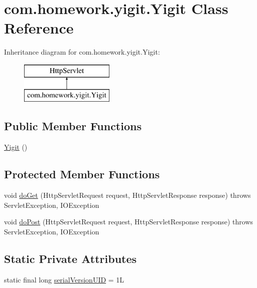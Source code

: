 \hypertarget{classcom_1_1homework_1_1yigit_1_1_yigit}{}\section{com.\+homework.\+yigit.\+Yigit Class Reference}
\label{classcom_1_1homework_1_1yigit_1_1_yigit}
Inheritance diagram for com.\+homework.\+yigit.\+Yigit\+:\begin{figure}[H]
\begin{center}
\leavevmode
\includegraphics[height=2.000000cm]{classcom_1_1homework_1_1yigit_1_1_yigit}
\end{center}
\end{figure}
\subsection*{Public Member Functions}
\begin{DoxyCompactItemize}
\item 
\hyperlink{classcom_1_1homework_1_1yigit_1_1_yigit_aaea0e6d1611342b65620024b51b35a07}{Yigit} ()
\end{DoxyCompactItemize}
\subsection*{Protected Member Functions}
\begin{DoxyCompactItemize}
\item 
void \hyperlink{classcom_1_1homework_1_1yigit_1_1_yigit_a9fcdb429a94b0c565c1f82f2d672f8ff}{do\+Get} (Http\+Servlet\+Request request, Http\+Servlet\+Response response)  throws Servlet\+Exception, I\+O\+Exception 
\item 
void \hyperlink{classcom_1_1homework_1_1yigit_1_1_yigit_a8d4031c9f7529c9a2bebeb0240049faa}{do\+Post} (Http\+Servlet\+Request request, Http\+Servlet\+Response response)  throws Servlet\+Exception, I\+O\+Exception 
\end{DoxyCompactItemize}
\subsection*{Static Private Attributes}
\begin{DoxyCompactItemize}
\item 
static final long \hyperlink{classcom_1_1homework_1_1yigit_1_1_yigit_a3bef3a83f56c1f7bb2c1540d6f879f6a}{serial\+Version\+U\+ID} = 1L
\end{DoxyCompactItemize}


